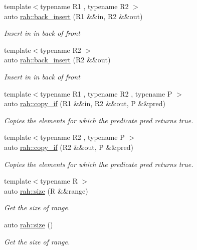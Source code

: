 \begin{DoxyCompactItemize}
{\footnotesize template$<$typename R1 , typename R2 $>$ }\\auto \mbox{\hyperlink{namespacerah_a2734b7f57efb773c6df8ac55b9d040cd}{rah\+::back\+\_\+insert}} (R1 \&\&in, R2 \&\&out)
\begin{DoxyCompactList}\small\item\em Insert {\itshape in} in back of {\itshape front} \end{DoxyCompactList}\item 
{\footnotesize template$<$typename R2 $>$ }\\auto \mbox{\hyperlink{namespacerah_a1c3ab6d88fc54b3638ef699d465e86b4}{rah\+::back\+\_\+insert}} (R2 \&\&out)
\begin{DoxyCompactList}\small\item\em Insert {\itshape in} in back of {\itshape front} \end{DoxyCompactList}\item 
{\footnotesize template$<$typename R1 , typename R2 , typename P $>$ }\\auto \mbox{\hyperlink{namespacerah_a550a133fe8c6de600a83959c82a0c592}{rah\+::copy\+\_\+if}} (R1 \&\&in, R2 \&\&out, P \&\&pred)
\begin{DoxyCompactList}\small\item\em Copies the elements for which the predicate pred returns true. \end{DoxyCompactList}\item 
{\footnotesize template$<$typename R2 , typename P $>$ }\\auto \mbox{\hyperlink{namespacerah_a1f17e9431b258cc701fa59672a65d7db}{rah\+::copy\+\_\+if}} (R2 \&\&out, P \&\&pred)
\begin{DoxyCompactList}\small\item\em Copies the elements for which the predicate pred returns true. \end{DoxyCompactList}\item 
{\footnotesize template$<$typename R $>$ }\\auto \mbox{\hyperlink{namespacerah_a85af749badb4261aa3c97a1d98134493}{rah\+::size}} (R \&\&range)
\begin{DoxyCompactList}\small\item\em Get the size of range. \end{DoxyCompactList}\item 
auto \mbox{\hyperlink{namespacerah_aaee48fa7a804b4fd19c6a78bdd8d4c85}{rah\+::size}} ()
\begin{DoxyCompactList}\small\item\em Get the size of range. \end{DoxyCompactList}\item 

\end{DoxyCompactItemize}
